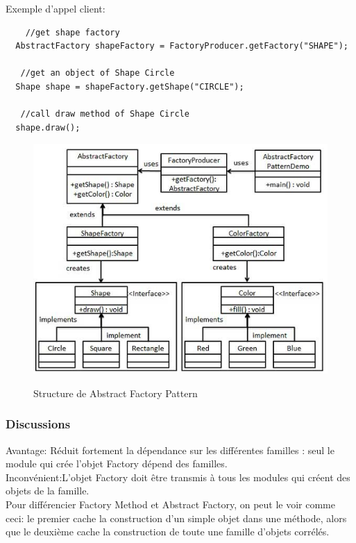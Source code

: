 \newpage
Exemple d'appel client: 
\begin{lstlisting}
    //get shape factory
  AbstractFactory shapeFactory = FactoryProducer.getFactory("SHAPE");

   //get an object of Shape Circle
  Shape shape = shapeFactory.getShape("CIRCLE");

   //call draw method of Shape Circle
  shape.draw();
\end{lstlisting}


\begin{figure}[!ht]
	\centering
	\begin{minipage}[t]{8.0cm}
		\includegraphics[scale=0.5]{Images/afact.jpg}
		\label{s1}
   		\caption{Structure de Abstract Factory Pattern}
	\end{minipage}
	
\end{figure}


\subsubsection{Discussions}
Avantage: Réduit	fortement	la	dépendance	sur	les	différentes	familles : seul	le module qui crée 
l'objet	Factory dépend des familles. \\
Inconvénient:L'objet Factory doit être transmis à tous les modules qui créent des objets de la famille. \\

Pour différencier Factory Method et Abstract Factory, on peut le voir comme ceci: le premier cache la construction d'un simple objet dans une méthode, alors que le deuxième cache la construction de toute une famille d'objets corrélés.  


